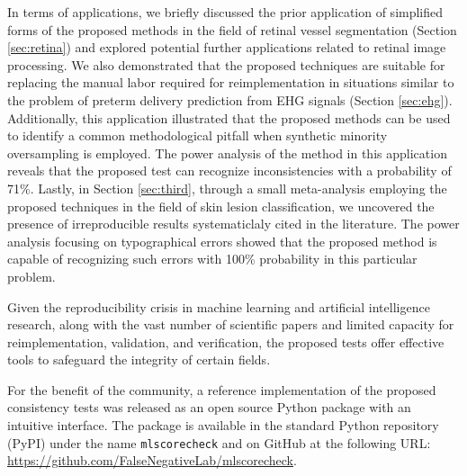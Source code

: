 \documentclass[3p, times]{elsarticle}
\begin{document}
In terms of applications, we briefly discussed the prior application of simplified forms of the proposed methods in the field of retinal vessel segmentation (Section \ref{sec:retina}) and explored potential further applications related to retinal image processing. 
We also demonstrated that the proposed techniques are suitable for replacing the manual labor required for reimplementation in situations similar to the problem of preterm delivery prediction from EHG signals (Section \ref{sec:ehg}).
Additionally, this application illustrated that the proposed methods can be used to identify a common methodological pitfall when synthetic minority oversampling is employed. 
{\color{blue} The power analysis of the method in this application reveals that the proposed test can recognize inconsistencies with a probability of 71\%.
Lastly, in Section \ref{sec:third}, through a small meta-analysis employing the proposed techniques in the field of skin lesion classification, we uncovered the presence of irreproducible results systematiclaly cited in the literature. The power analysis focusing on typographical errors showed that the proposed method is capable of recognizing such errors with 100\% probability in this particular problem.}


{\color{blue} Given the reproducibility crisis in machine learning and artificial intelligence research, along with the vast number of scientific papers and limited capacity for reimplementation, validation, and verification, the proposed tests offer effective tools to safeguard the integrity of certain fields.}

For the benefit of the community, a reference implementation of the proposed consistency tests was released as an open source Python package with an intuitive interface. The package is available in the standard Python repository (PyPI) under the name \verb|mlscorecheck| \cite{mlscorecheck} and on GitHub at the following URL: \url{https://github.com/FalseNegativeLab/mlscorecheck}.

% 



\end{document}
